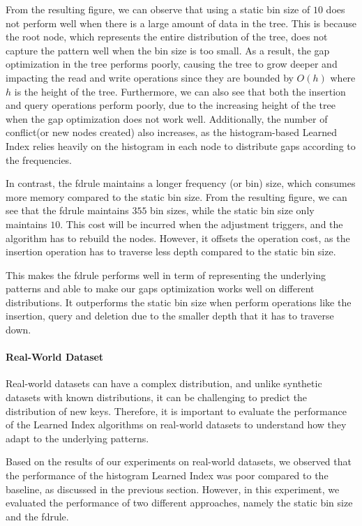 \documentclass[11pt,a4paper]{article}
\newcommand{\learnindex}{\textsf{Learned Index}\xspace}
\newcommand{\conflict}{\textsf{conflict}\xspace}
\begin{document}
From the resulting figure, we can observe that using a static bin size of $10$ does not perform well when there is a large amount of data in the tree. This is because the root node, which represents the entire distribution of the tree, does not capture the pattern well when the bin size is too small. As a result, the gap optimization in the tree performs poorly, causing the tree to grow deeper and impacting the read and write operations since they are bounded by $O(h)$ where $h$ is the height of the tree. Furthermore, we can also see that both the insertion and query operations perform poorly, due to the increasing height of the tree when the gap optimization does not work well. Additionally, the number of \conflict (or new nodes created) also increases, as the histogram-based \learnindex relies heavily on the histogram in each node to distribute gaps according to the frequencies.

In contrast, the \acrshort{fdrule} maintains a longer frequency (or bin) size, which consumes more memory compared to the static bin size. From the resulting figure, we can see that the \acrshort{fdrule} maintains $355$ bin sizes, while the static bin size only maintains $10$. This cost will be incurred when the adjustment triggers, and the algorithm has to rebuild the nodes. However, it offsets the operation cost, as the insertion operation has to traverse less depth compared to the static bin size. 

This makes the \acrshort{fdrule} performs well in term of representing the underlying patterns and able to make our gaps optimization works well on different distributions. It outperforms the static bin size when perform operations like the insertion, query and deletion due to the smaller depth that it has to traverse down.

\paragraph{Real-World Dataset} Real-world datasets can have a complex distribution, and unlike synthetic datasets with known distributions, it can be challenging to predict the distribution of new keys. Therefore, it is important to evaluate the performance of the \learnindex algorithms on real-world datasets to understand how they adapt to the underlying patterns.

Based on the results of our experiments on real-world datasets, we observed that the performance of the histogram \learnindex was poor compared to the baseline, as discussed in the previous section. However, in this experiment, we evaluated the performance of two different approaches, namely the static bin size and the \acrshort{fdrule}.
\end{document}
